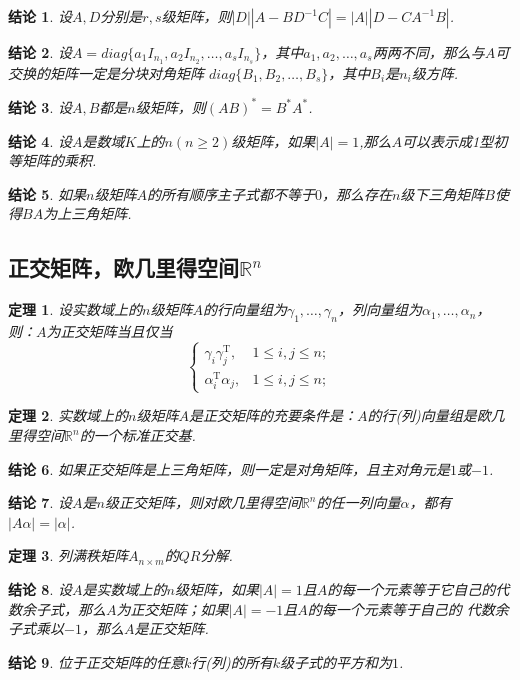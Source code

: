 \documentclass[UTF8]{article}
\newtheorem{thrm}{定理}[subsection]
\newtheorem{ccl}{结论}[subsection]
\begin{document}
\begin{ccl}
  设$A,D$分别是$r,s$级矩阵，则$|D||A-BD^{-1}C|=|A||D-CA^{-1}B|$.
\end{ccl}
\begin{ccl}
    设$A=diag\{a_1I_{n_1},a_2I_{n_2},\ldots,a_sI_{n_s}\}$，其中$a_1,a_2,\ldots,a_s$两两不同，那么与$A$可交换的矩阵一定是分块对角矩阵
    $diag\{B_1,B_2,\ldots,B_s\}$，其中$B_i$是$n_i$级方阵.
\end{ccl}
\begin{ccl}
  设$A,B$都是$n$级矩阵，则$(AB)^{*}=B^{*}A^{*}$.
\end{ccl}
\begin{ccl}
  设$A$是数域$K$上的$n(n\ge 2)$级矩阵，如果$|A|=1$,那么$A$可以表示成1型初等矩阵的乘积.
\end{ccl}
\begin{ccl}
  如果$n$级矩阵$A$的所有顺序主子式都不等于$0$，那么存在$n$级下三角矩阵$B$使得$BA$为上三角矩阵.
\end{ccl}

\subsection{正交矩阵，欧几里得空间$\mathbb{R}^n$}
\begin{thrm}
  设实数域上的$n$级矩阵$A$的行向量组为$\gamma_1,\ldots,\gamma_n$，列向量组为$\alpha_1,\ldots,\alpha_n$，则：$A$为正交矩阵当且仅当
  \[
  \begin{cases}
    \gamma_i\gamma_j^{\mathrm{T}},&1\le i,j\le n;\\
    \alpha_i^{\mathrm{T}}\alpha_j,&1\le i,j\le n;
  \end{cases}
  \]
\end{thrm}
\begin{thrm}
  实数域上的$n$级矩阵$A$是正交矩阵的充要条件是：$A$的行(列)向量组是欧几里得空间$\mathbb{R}^n$的一个标准正交基.
\end{thrm}
\begin{ccl}
  如果正交矩阵是上三角矩阵，则一定是对角矩阵，且主对角元是$1$或$-1$.
\end{ccl}
\begin{ccl}
  设$A$是$n$级正交矩阵，则对欧几里得空间$\mathbb{R}^n$的任一列向量$\alpha$，都有$|A\alpha|=|\alpha|$.
\end{ccl}
\begin{thrm}
  列满秩矩阵$A_{n\times m}$的$QR$分解.
\end{thrm}
\begin{ccl}
  设$A$是实数域上的$n$级矩阵，如果$|A|=1$且$A$的每一个元素等于它自己的代数余子式，那么$A$为正交矩阵；如果$|A|=-1$且$A$的每一个元素等于自己的
  代数余子式乘以$-1$，那么$A$是正交矩阵.
\end{ccl}
\begin{ccl}
  位于正交矩阵的任意$k$行(列)的所有$k$级子式的平方和为$1$.
\end{ccl}
\end{document}
